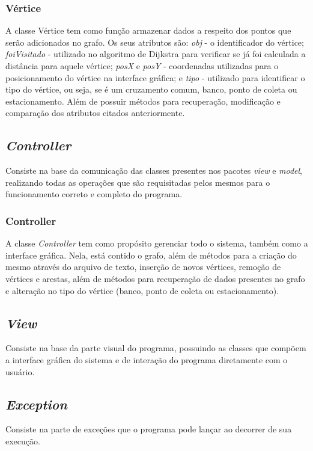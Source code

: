 \documentclass[12pt]{article}
\begin{document}
\subsubsection{Vértice}
A classe Vértice tem como função armazenar dados a respeito dos pontos que serão adicionados no grafo. Os seus atributos são: {\itshape obj} - o identificador do vértice; {\itshape foiVisitado} - utilizado no algoritmo de Dijkstra para verificar se já foi calculada a distância para aquele vértice; {\itshape posX} e {\itshape posY} - coordenadas utilizadas para o posicionamento do vértice na interface gráfica; e {\itshape tipo} - utilizado para identificar o tipo do vértice, ou seja, se é um cruzamento comum, banco, ponto de coleta ou estacionamento. Além de possuir métodos para recuperação, modificação e comparação dos atributos citados anteriormente.

\subsection{{\itshape Controller}}
Consiste na base da comunicação das classes presentes nos pacotes {\itshape view} e {\itshape model}, realizando todas as operações que são requisitadas pelos mesmos para o funcionamento correto e completo do programa.

\subsubsection{Controller}
A classe {\itshape Controller} tem como propósito gerenciar todo o sistema, também como a interface gráfica. Nela, está contido o grafo, além de métodos para a criação do mesmo através do arquivo de texto, inserção de novos vértices, remoção de vértices e arestas, além de métodos para recuperação de dados presentes no grafo e alteração no tipo do vértice (banco, ponto de coleta ou estacionamento).

\subsection{{\itshape View}}
Consiste na base da parte visual do programa, possuindo as classes que compõem a interface gráfica do sistema e de interação do programa diretamente com o usuário.

\subsection{{\itshape Exception}}
Consiste na parte de exceções que o programa pode lançar ao decorrer de sua execução.
\end{document}
